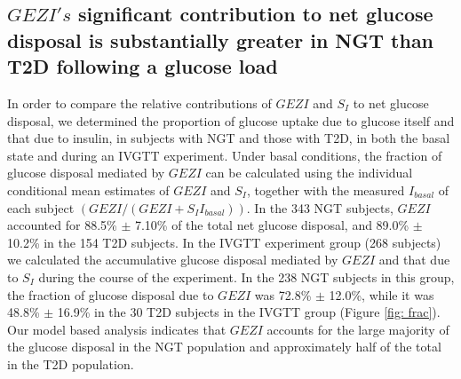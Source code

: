 \documentclass[utf8]{frontiersSCNS} %
\begin{document}
\subsection{$GEZI's$ significant contribution to net glucose disposal is substantially greater in NGT than T2D following a glucose load}
In order to compare the relative contributions of $GEZI$ and $S_I$ to net glucose disposal, we determined the proportion of glucose uptake due to glucose itself and that due to insulin, in subjects with NGT and those with T2D, in both the basal state and during an IVGTT experiment. Under basal conditions, the fraction of glucose disposal mediated by $GEZI$ can be calculated using the individual conditional mean estimates of $GEZI$ and $S_I$, together with the measured $I_{basal}$ of each subject $\left( {GEZI/\left( {GEZI + {S_I}{I_{basal}}} \right)} \right)$. In the 343 NGT subjects, $GEZI$ accounted for 88.5\% $\pm$ 7.10\% of the total net glucose disposal, and 89.0\% $\pm$ 10.2\% in the 154 T2D subjects. In the IVGTT experiment group (268 subjects) we calculated the accumulative glucose disposal mediated by $GEZI$ and that due to $S_I$ during the course of the experiment. In the 238 NGT subjects in this group, the fraction of glucose disposal due to $GEZI$ was 72.8\% $\pm$ 12.0\%, while it was 48.8\% $\pm$ 16.9\% in the 30 T2D subjects in the IVGTT group (Figure \ref{fig: frac}). Our model based analysis indicates that $GEZI$ accounts for the large majority of the glucose disposal in the NGT population and approximately half of the total in the T2D population.  
\end{document}
